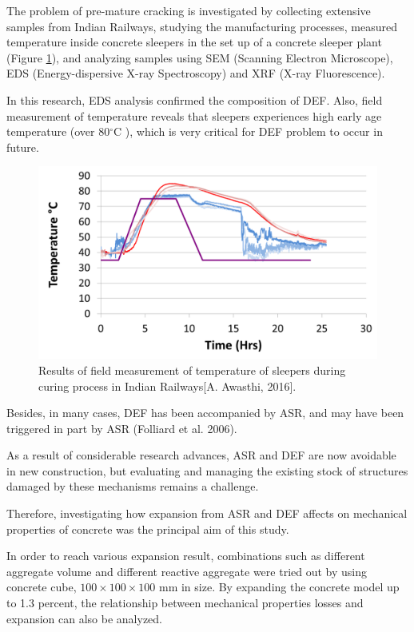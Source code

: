 The problem of pre-mature cracking is investigated by collecting extensive samples from Indian Railways, studying the manufacturing processes, measured temperature inside concrete sleepers in the set up of a concrete sleeper plant (Figure \ref{fig:Awasthi_2}), and analyzing samples using SEM (Scanning Electron Microscope), EDS (Energy-dispersive X-ray Spectroscopy) and XRF (X-ray Fluorescence).

In this research, EDS analysis confirmed the composition of DEF. Also, field measurement of temperature reveals that sleepers experiences high early age temperature (over 80$^\circ$C ), which is very critical for DEF problem to occur in future.

    \begin{figure}[ht!]
        \centering
        \includegraphics[width=.8\linewidth]{Files/Background/Anupam_2.png}
        \caption{Results of field measurement of temperature of sleepers during curing process in Indian Railways[A. Awasthi, 2016\cite{Awasthi}].}
        \label{fig:Awasthi_2}
    \end{figure}

Besides, in many cases, DEF has been accompanied by ASR, and may have been triggered in part by ASR (Folliard et al. 2006)\cite{Folliard}.

As a result of considerable research advances, ASR and DEF are now avoidable in new construction, but evaluating and managing the existing stock of structures damaged by these mechanisms remains a challenge.

Therefore, investigating how expansion from ASR and DEF affects on mechanical properties of concrete was the principal aim of this study.

In order to reach various expansion result, combinations such as different aggregate volume and different reactive aggregate were tried out by using concrete cube, $100 \times 100 \times 100$ mm in size. By expanding the concrete model up to 1.3 percent, the relationship between mechanical properties losses and expansion can also be analyzed.

